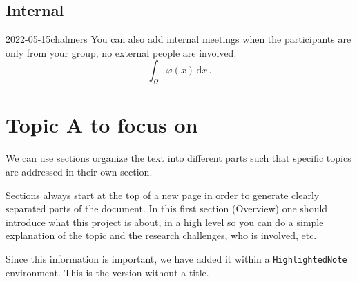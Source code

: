 \documentclass{project-logbook}
\begin{document}
	\subsection{Internal}
		\begin{MeetingMinutes}{2022-05-15}{chalmers}
			You can also add internal meetings when the participants are only from your group, no external people are involved.
			\begin{equation}
				\int_{\Omega}{\varphi(x)}\,\mathrm{d}x\,.
			\end{equation}
			\lipsum[1]
		\end{MeetingMinutes}


\section{Topic A to focus on} \label{sec:topic_A}
	We can use sections organize the text into different parts  such that specific topics are addressed in their own section.

	\begin{HighlightedNote}{}
		Sections always start at the top of a new page in order to generate clearly separated parts of the document. In this first section (Overview) one should introduce what this project is about, in a high level so you can do a simple explanation of the topic and the research challenges, who is involved, etc.

		Since this information is important, we have added it within a \texttt{HighlightedNote} environment. This is the version without a title.
	\end{HighlightedNote}
\end{document}
